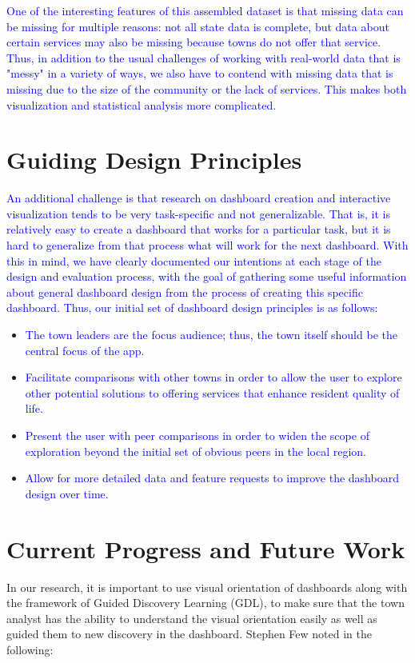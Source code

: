 \documentclass[10pt]{article}\usepackage[]{graphicx}\usepackage[]{color}
\newcommand{\svp}[1]{{\textcolor{blue}{#1}}}
\begin{document}
\svp{One of the interesting features of this assembled dataset is that missing data can be missing for multiple reasons: not all state data is complete, but data about certain services may also be missing because towns do not offer that service.}
\svp{Thus, in addition to the usual challenges of working with real-world data that is "messy" in a variety of ways, we also have to contend with missing data that is missing due to the size of the community or the lack of services. This makes both visualization and statistical analysis more complicated.}

\section{Guiding Design Principles}
\svp{An additional challenge is that research on dashboard creation and interactive visualization tends to be very task-specific and not generalizable. That is, it is relatively easy to create a dashboard that works for a particular task, but it is hard to generalize from that process what will work for the next dashboard. With this in mind, we have clearly documented our intentions at each stage of the design and evaluation process, with the goal of gathering some useful information about general dashboard design from the process of creating this specific dashboard.}
\svp{Thus, our initial set of dashboard design principles is as follows: }
\begin{itemize}
\item \svp{The town leaders are the focus audience; thus, the town itself should be the central focus of the app.}
\item \svp{Facilitate comparisons with other towns in order to allow the user to explore other potential solutions to offering services that enhance resident quality of life.}
\item \svp{Present the user with peer comparisons in order to widen the scope of exploration beyond the initial set of obvious peers in the local region.}
\item \svp{Allow for more detailed data and feature requests to improve the dashboard design over time.}
\end{itemize}


\section{Current Progress and Future Work}
In our research, it is important to use visual orientation of dashboards along with the framework of Guided Discovery Learning (GDL), to make sure that the town analyst has the ability to understand the visual orientation easily as well as guided them to new discovery in the dashboard. 
Stephen Few noted in  the following:
\begin{quotation}
\end{quotation}
\end{document}

